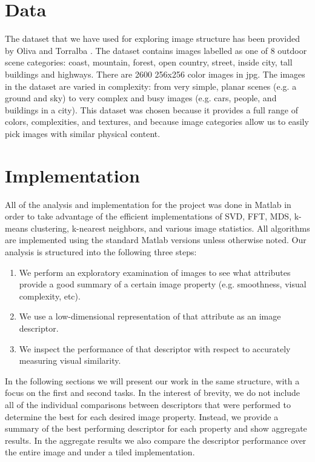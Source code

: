 \documentclass{report}
\begin{document}
\section{Data}
The dataset that we have used for exploring image structure has been provided by Oliva and Torralba \cite{gist_descriptor}. The dataset contains images labelled as one of 8 outdoor scene categories: coast, mountain, forest, open country, street, inside city, tall buildings and highways. There are 2600 256x256 color images in jpg. The images in the dataset are varied in complexity: from very simple, planar scenes (e.g. a ground and sky) to very complex and busy images (e.g. cars, people, and buildings in a city). This dataset was chosen because it provides a full range of colors, complexities, and textures, and because image categories allow us to easily pick images with similar physical content.

\section{Implementation}
All of the analysis and implementation for the project was done in Matlab in order to take advantage of the efficient implementations of SVD, FFT, MDS, k-means clustering, k-nearest neighbors, and various image statistics. All algorithms are implemented using the standard Matlab versions unless otherwise noted. Our analysis is structured into the following three steps:
\begin{enumerate}
  \item We perform an exploratory examination of images to see what attributes provide a good summary of a certain image property (e.g. smoothness, visual complexity, etc).
  \item We use a low-dimensional representation of that attribute as an image descriptor.
  \item We inspect the performance of that descriptor with respect to accurately measuring visual similarity.
\end{enumerate}
In the following sections we will present our work in the same structure, with a focus on the first and second tasks. In the interest of brevity, we do not include all of the individual comparisons between descriptors that were performed to determine the best for each desired image property. Instead, we provide a summary of the best performing descriptor for each property and show aggregate results. In the aggregate results we also compare the descriptor performance over the entire image and under a tiled implementation.
\end{document}
